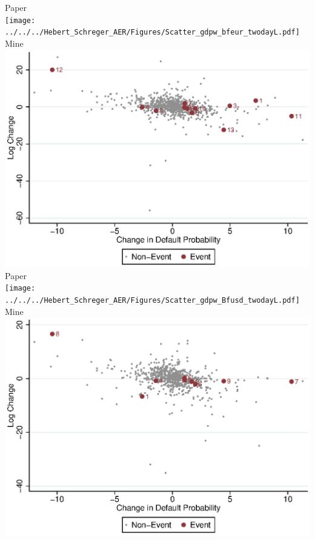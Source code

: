 \documentclass{article}
\begin{document}
Paper \\
\texttt{[image: ../../../Hebert\_Schreger\_AER/Figures/Scatter\_gdpw\_bfeur\_twodayL.pdf]}\\
Mine \\
\includegraphics[scale = .8]{Scatter_gdpw_bfeur_twodayL.eps}\\
\newpage Paper \\
\texttt{[image: ../../../Hebert\_Schreger\_AER/Figures/Scatter\_gdpw\_Bfusd\_twodayL.pdf]}\\
Mine \\
\includegraphics[scale = .8]{Scatter_gdpw_Bfusd_twodayL.eps}\\
\end{document}
